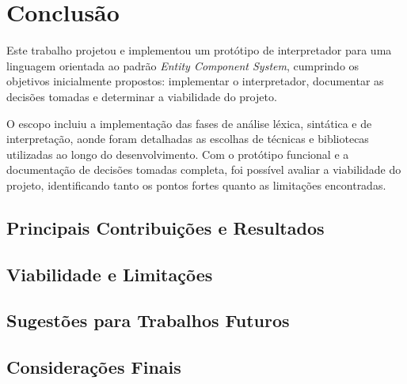 \chapter{Conclusão} \label{ch:conclusao}

Este trabalho projetou e implementou um protótipo de interpretador para uma linguagem orientada ao padrão \textit{Entity Component System}, cumprindo os objetivos inicialmente propostos: implementar o interpretador, documentar as decisões tomadas e determinar a viabilidade do projeto.

O escopo incluiu a implementação das fases de análise léxica, sintática e de interpretação, aonde foram detalhadas as escolhas de técnicas e bibliotecas utilizadas ao longo do desenvolvimento. Com o protótipo funcional e a documentação de decisões tomadas completa, foi possível avaliar a viabilidade do projeto, identificando tanto os pontos fortes quanto as limitações encontradas.

\section{Principais Contribuições e Resultados}

\section{Viabilidade e Limitações}

\section{Sugestões para Trabalhos Futuros}

\section{Considerações Finais}
